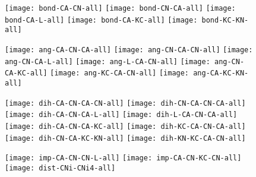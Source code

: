 \documentclass{article}
\begin{document}
\begin{figure}
  \begin{center}
    \begin{minipage}[t]{1.0\textwidth}
      \texttt{[image: bond-CA-CN-all]}
      \texttt{[image: bond-CN-CA-all]}
      \texttt{[image: bond-CA-L-all]}
      \texttt{[image: bond-CA-KC-all]}
      \texttt{[image: bond-KC-KN-all]}
    \end{minipage}
  \end{center}
\end{figure}

\begin{figure}
  \begin{center}
    \begin{minipage}[t]{1.0\textwidth}
      \texttt{[image: ang-CA-CN-CA-all]}
      \texttt{[image: ang-CN-CA-CN-all]}
      \texttt{[image: ang-CN-CA-L-all]}
      \texttt{[image: ang-L-CA-CN-all]}
      \texttt{[image: ang-CN-CA-KC-all]}
      \texttt{[image: ang-KC-CA-CN-all]}
      \texttt{[image: ang-CA-KC-KN-all]}
    \end{minipage}
  \end{center}
\end{figure}

\begin{figure}
  \begin{center}
    \begin{minipage}[t]{1.0\textwidth}
      \texttt{[image: dih-CA-CN-CA-CN-all]}
      \texttt{[image: dih-CN-CA-CN-CA-all]}
      \texttt{[image: dih-CA-CN-CA-L-all]}
      \texttt{[image: dih-L-CA-CN-CA-all]}
      \texttt{[image: dih-CA-CN-CA-KC-all]}
      \texttt{[image: dih-KC-CA-CN-CA-all]}
      \texttt{[image: dih-CN-CA-KC-KN-all]}
      \texttt{[image: dih-KN-KC-CA-CN-all]}
    \end{minipage}
  \end{center}
\end{figure}

\begin{figure}
  \begin{center}
    \begin{minipage}[t]{1.0\textwidth}
      \texttt{[image: imp-CA-CN-CN-L-all]}
      \texttt{[image: imp-CA-CN-KC-CN-all]}
      \texttt{[image: dist-CNi-CNi4-all]}
    \end{minipage}
  \end{center}
\end{figure}
\end{document}

